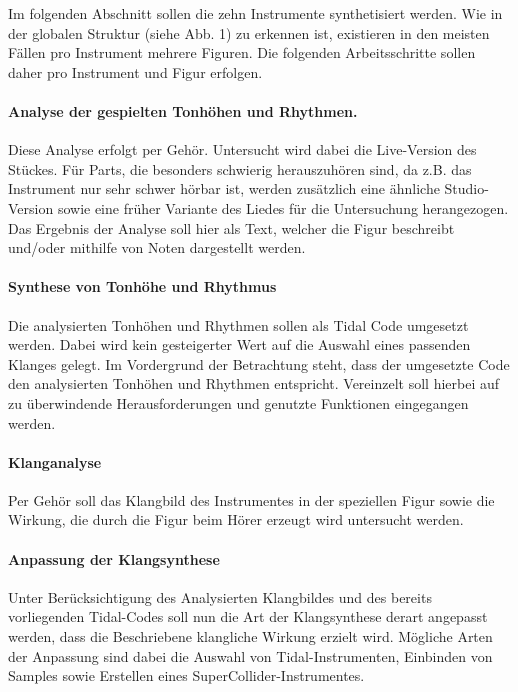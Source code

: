 \documentclass[
10pt, %
a4paper, %
oneside, %
headinclude,footinclude, %
BCOR5mm, %
]{scrartcl}
\begin{document}
\noindent Im folgenden Abschnitt sollen die zehn Instrumente synthetisiert werden. Wie in der globalen Struktur (siehe Abb. 1) zu erkennen ist, existieren in den meisten Fällen pro Instrument mehrere Figuren. Die folgenden Arbeitsschritte sollen daher pro Instrument und Figur erfolgen.

\paragraph{Analyse der gespielten Tonhöhen und Rhythmen.}  Diese Analyse erfolgt per Gehör. Untersucht wird dabei die Live-Version\cite{YT1} des Stückes. Für Parts, die besonders schwierig herauszuhören sind, da z.B. das Instrument nur sehr schwer hörbar ist, werden zusätzlich eine ähnliche Studio-Version\cite{YT2} sowie eine früher Variante\cite{YT3} des Liedes für die Untersuchung herangezogen.	Das Ergebnis der Analyse soll hier als Text, welcher die Figur beschreibt und/oder mithilfe von Noten dargestellt werden. 

\paragraph{Synthese von Tonhöhe und Rhythmus} Die analysierten Tonhöhen und Rhythmen sollen als Tidal Code umgesetzt werden. Dabei wird kein gesteigerter Wert auf die Auswahl eines passenden Klanges gelegt. Im Vordergrund der Betrachtung steht, dass der umgesetzte Code den analysierten Tonhöhen und Rhythmen entspricht. Vereinzelt soll hierbei auf zu überwindende Herausforderungen und genutzte Funktionen eingegangen werden.

\paragraph{Klanganalyse} Per Gehör soll das Klangbild des Instrumentes in der speziellen Figur sowie die Wirkung, die durch die Figur beim Hörer erzeugt wird untersucht werden. 

\paragraph{Anpassung der Klangsynthese} Unter Berücksichtigung des Analysierten Klangbildes und des bereits vorliegenden Tidal-Codes soll nun die Art der Klangsynthese derart angepasst werden, dass die Beschriebene klangliche Wirkung erzielt wird. Mögliche Arten der Anpassung sind dabei die Auswahl von Tidal-Instrumenten, Einbinden von Samples sowie Erstellen eines SuperCollider-Instrumentes.\\
\end{document}
